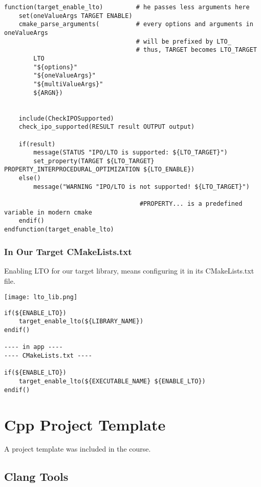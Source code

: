 \documentclass[openany]{report}
\begin{document}
\begin{verbatim}
function(target_enable_lto)         # he passes less arguments here
    set(oneValueArgs TARGET ENABLE)
    cmake_parse_arguments(          # every options and arguments in oneValueArgs
                                    # will be prefixed by LTO_
                                    # thus, TARGET becomes LTO_TARGET
        LTO
        "${options}"
        "${oneValueArgs}"
        "${multiValueArgs}"
        ${ARGN})


    include(CheckIPOSupported)
    check_ipo_supported(RESULT result OUTPUT output)

    if(result) 
        message(STATUS "IPO/LTO is supported: ${LTO_TARGET}")
        set_property(TARGET ${LTO_TARGET} PROPERTY_INTERPROCEDURAL_OPTIMIZATION ${LTO_ENABLE})
    else()
        message("WARNING "IPO/LTO is not supported! ${LTO_TARGET}")

                                     #PROPERTY... is a predefined variable in modern cmake
    endif()
endfunction(target_enable_lto)
\end{verbatim}

\subsection{In Our Target CMakeLists.txt}

Enabling LTO for our target library, means configuring it in its CMakeLists.txt file.

\begin{center}
    \texttt{[image: lto\_lib.png]}
\end{center}


\begin{verbatim}
if(${ENABLE_LTO})
    target_enable_lto(${LIBRARY_NAME})
endif()

---- in app ----
---- CMakeLists.txt ----

if(${ENABLE_LTO})
    target_enable_lto(${EXECUTABLE_NAME} ${ENABLE_LTO})
endif()
\end{verbatim}

\chapter{Cpp Project Template}

A project template was included in the course. 


\section{Clang Tools}
\end{document}
